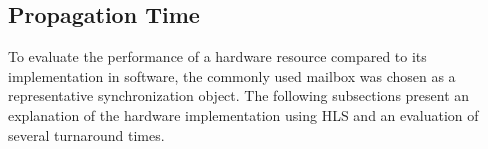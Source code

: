 

\subsection{Propagation Time}
To evaluate the performance of a hardware resource compared to its
implementation in software, the commonly used mailbox was chosen as a
representative synchronization object. The following subsections present an
explanation of the hardware implementation using \ac{HLS} and an evaluation of
several turnaround times.
